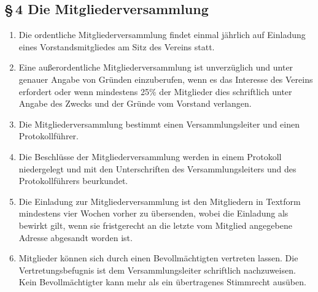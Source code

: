 \documentclass[12pt,a4paper]{article}
\begin{document}
\subsection*{§\,4 Die Mitgliederversammlung}
\begin{enumerate}
\item Die ordentliche Mitgliederversammlung findet einmal jährlich auf Einladung eines Vorstandsmitgliedes am Sitz des Vereins statt.
\item Eine außerordentliche Mitgliederversammlung ist unverzüglich und unter genauer Angabe von Gründen einzuberufen, wenn es das Interesse des Vereins erfordert oder wenn mindestens 25\% der Mitglieder dies schriftlich unter Angabe des Zwecks und der Gründe vom Vorstand verlangen.
\item Die Mitgliederversammlung bestimmt einen Versammlungsleiter und einen Protokollführer.
\item Die Beschlüsse der Mitgliederversammlung werden in einem Protokoll niedergelegt und mit den Unterschriften des Versammlungsleiters und des Protokollführers beurkundet.
\item Die Einladung zur Mitgliederversammlung ist den Mitgliedern in Textform mindestens vier Wochen vorher zu übersenden, wobei die Einladung als bewirkt gilt, wenn sie fristgerecht an die letzte vom Mitglied angegebene Adresse abgesandt worden ist.
\item Mitglieder können sich durch einen Bevollmächtigten vertreten lassen. Die Vertretungsbefugnis ist dem Versammlungsleiter schriftlich nachzuweisen. Kein Bevollmächtigter kann mehr als ein übertragenes Stimmrecht ausüben.

\end{enumerate}
\end{document}
